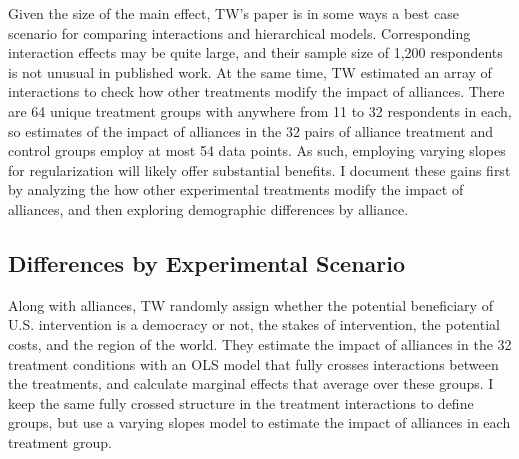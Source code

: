 \documentclass[12pt]{article}
\begin{document}
Given the size of the main effect, TW's paper is in some ways a best case scenario for comparing interactions and hierarchical models. 
Corresponding interaction effects may be quite large, and their sample size of 1,200 respondents is not unusual in published work. 
At the same time, TW estimated an array of interactions to check how other treatments modify the impact of alliances.
There are 64 unique treatment groups with anywhere from 11 to 32 respondents in each, so estimates of the impact of alliances in the 32 pairs of alliance treatment and control groups employ at most 54 data points. 
As such, employing varying slopes for regularization will likely offer substantial benefits. 
I document these gains first by analyzing the how other experimental treatments modify the impact of alliances, and then exploring demographic differences by alliance. 



\subsection{Differences by Experimental Scenario}


Along with alliances, TW randomly assign whether the potential beneficiary of U.S. intervention is a democracy or not, the stakes of intervention, the potential costs, and the region of the world. 
They estimate the impact of alliances in the 32 treatment conditions with an OLS model that fully crosses interactions between the treatments, and calculate marginal effects that average over these groups. 
I keep the same fully crossed structure in the treatment interactions to define groups, but use a varying slopes model to estimate the impact of alliances in each treatment group.
\end{document}
